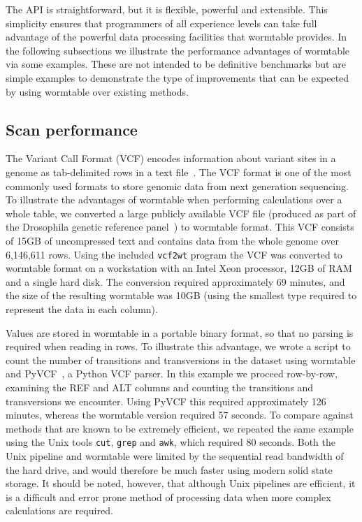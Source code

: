 \documentclass[10pt]{bmc_article}
\newenvironment{bmcformat}{\begin{raggedright}\baselineskip20pt\sloppy\setboolean{publ}{false}}{\end{raggedright}\baselineskip20pt\sloppy}
\begin{document}
\begin{bmcformat}
The API is straightforward, but it is flexible, powerful and 
extensible. This simplicity ensures that 
programmers of all experience levels  
can take full advantage of the powerful data 
processing facilities that wormtable provides. In the following subsections 
we illustrate the performance advantages of wormtable via some 
examples. These are not intended to be definitive benchmarks
but are simple examples to demonstrate the type of improvements 
that can be expected by using wormtable over existing methods.

\subsection*{Scan performance}
The Variant Call Format (VCF) encodes information about variant sites in a genome 
as tab-delimited rows in a text file~\cite{da+11}. The VCF format is one of 
the most commonly used formats to store genomic data from next generation sequencing.
To illustrate the advantages of wormtable when performing calculations over 
a whole table, we converted a large 
publicly available VCF file (produced as part of the
Drosophila genetic reference panel~\cite{mr+12}) to wormtable format.
This VCF\cite{freeze.vcf}
consists of 15GB of uncompressed text and contains data from the 
whole genome over 6,146,611 rows.
Using the included \texttt{vcf2wt} program
the VCF was converted to wormtable format 
on a workstation with an Intel Xeon processor, 12GB of RAM 
and a single hard disk. The
conversion required approximately 69 minutes, and the size of the resulting  
wormtable was 10GB (using the smallest type required
to represent the data in each column).

Values are stored in wormtable in a portable binary format, so that no parsing is
required when reading in rows. To illustrate this advantage, we
wrote a script to count the number of transitions and transversions
in the dataset using wormtable and PyVCF~\cite{pyvcf},
a Python VCF parser.  In this example we proceed 
row-by-row, examining the REF and ALT columns and
counting the transitions and transversions we encounter. 
Using PyVCF this required approximately 126 minutes, whereas 
the wormtable version required
57 seconds. To compare against methods that are known to be extremely
efficient, we repeated the same 
example using the Unix tools \texttt{cut}, \texttt{grep} 
and \texttt{awk},  which required 80 seconds. Both the
Unix pipeline and wormtable were limited by the sequential read
bandwidth of the hard drive, and would therefore be much 
faster using modern solid state storage.
It should be noted, however, that although Unix 
pipelines are efficient, it is a difficult and error prone method 
of processing data when more complex calculations are required.


\end{bmcformat}
\end{document}
